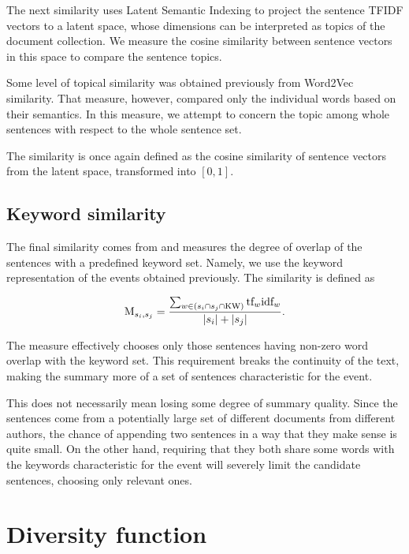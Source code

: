 The next similarity uses Latent Semantic Indexing \cite{lsi} to project the sentence TFIDF vectors to a latent space, whose dimensions can be interpreted as topics of the document collection. We measure the cosine similarity between sentence vectors in this space to compare the sentence topics.

Some level of topical similarity was obtained previously from Word2Vec similarity. That measure, however, compared only the individual words based on their semantics. In this measure, we attempt to concern the topic among whole sentences with respect to the whole sentence set.

The similarity is once again defined as the cosine similarity of sentence vectors from the latent space, transformed into $[0, 1]$.

\subsection{Keyword similarity}

The final similarity comes from \cite{mogren-2} and measures the degree of overlap of the sentences with a predefined keyword set. Namely, we use the keyword representation of the events obtained previously. The similarity is defined as 

\begin{equation}
	\text{M}_{s_{i}, s_{j}} = \frac{\sum_{w \in \left( s_{i} \cap s_{j} \cap \text{KW} \right)} \text{tf}_{w} \text{idf}_{w}}{\left| s_{i} \right| + \left| s_{j} \right|}.
\end{equation}

The measure effectively chooses only those sentences having non-zero word overlap with the keyword set. This requirement breaks the continuity of the text, making the summary more of a set of sentences characteristic for the event.

This does not necessarily mean losing some degree of summary quality. Since the sentences come from a potentially large set of different documents from different authors, the chance of appending two sentences in a way that they make sense is quite small. On the other hand, requiring that they both share some words with the keywords characteristic for the event will severely limit the candidate sentences, choosing only relevant ones. 


\section{Diversity function}